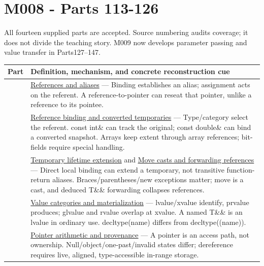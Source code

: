 \section{M008 - Parts 113-126}\label{appendix-fd090d982a15-m008---parts-113-126}

All fourteen supplied parts are accepted. Source numbering audits coverage; it does not divide the teaching story. M009 now develops parameter passing and value transfer in Parts127--147.

{\def\LTcaptype{none} %
\begin{longtable}[]{@{}
  >{\raggedright\arraybackslash}p{}
  >{\raggedright\arraybackslash}p{}@{}}
\toprule\noalign{}
\begin{minipage}[b]{\linewidth}\raggedright
Part
\end{minipage} & \begin{minipage}[b]{\linewidth}\raggedright
Definition, mechanism, and concrete reconstruction cue
\end{minipage} \\
\midrule\noalign{}
\endhead
\bottomrule\noalign{}
\endlastfoot
113 & \hyperref[appendix-d6d562ca9fbb]{References and aliases} --- Binding establishes an alias; assignment acts on the referent. A reference-to-pointer can reseat that pointer, unlike a reference to its pointee. \\
114 & \hyperref[appendix-37856d997bb0]{Reference binding and converted temporaries} --- Type/category select the referent. const int\& can track the original; const double\& can bind a converted snapshot. Arrays keep extent through array references; bit-fields require special handling. \\
115 & \hyperref[appendix-a978b29bbbb0]{Temporary lifetime extension} and \hyperref[appendix-0104b704fb11]{Move casts and forwarding references} --- Direct local binding can extend a temporary, not transitive function-return aliases. Braces/parentheses/new exceptions matter; move is a cast, and deduced T\&\& forwarding collapses references. \\
116 & \hyperref[appendix-1121b30eaeb0]{Value categories and materialization} --- lvalue/xvalue identify, prvalue produces; glvalue and rvalue overlap at xvalue. A named T\&\& is an lvalue in ordinary use. decltype(name) differs from decltype((name)). \\
117 & \hyperref[appendix-6af5921bc853]{Pointer arithmetic and provenance} --- A pointer is an access path, not ownership. Null/object/one-past/invalid states differ; dereference requires live, aligned, type-accessible in-range storage. \\

\end{longtable}}
